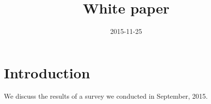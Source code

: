 \documentclass{casicswhitepaper}
\begin{document}
\title{White paper}
\date{2015-11-25}
\maketitle

\section{Introduction}

We discuss the results of a survey we conducted in September, 2015. 
\end{document}
